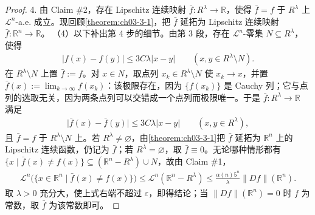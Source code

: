 \documentclass[../../main.tex]{subfiles}%
\begin{document}
\begin{proof}
4. 由 Claim \#2，存在 Lipschitz 连续映射 $\bar f:R^\lambda\to\mathbb{R}$，使得 $\bar f=f$ 于 $R^\lambda$ 上 $\mathcal{L}^n$-a.e. 成立。现回顾\cref{theorem:ch03-3-1}，把 $\bar f$ 延拓为 Lipschitz 连续映射 $\bar f:\mathbb{R}^n\to\mathbb{R}$。%
（4）以下补出第 4 步的细节。由第 3 段，存在 $\mathcal{L}^n$-零集 $N\subseteq R^\lambda$，使得
\begin{align*}
\lvert f(x)-f(y)\rvert\le3C\lambda\lvert x-y\rvert\qquad(x,y\in R^\lambda\setminus N).
\end{align*}
在 $R^\lambda\setminus N$ 上置 $\bar f:=f$。对 $x\in N$，取点列 $x_k\in R^\lambda\setminus N$ 使 $x_k\to x$，并置 $\bar f(x):=\lim_{k\to\infty}f(x_k)$：该极限存在，因为 $\{f(x_k)\}$ 是 Cauchy 列；它与点列的选取无关，因为两条点列可以交错成一个点列而极限唯一。于是 $\bar f:R^\lambda\to\mathbb{R}$ 满足
\begin{align*}
\lvert\bar f(x)-\bar f(y)\rvert\le3C\lambda\lvert x-y\rvert\qquad(x,y\in R^\lambda),
\end{align*}
且 $\bar f=f$ 于 $R^\lambda\setminus N$ 上。若 $R^\lambda\ne\varnothing$，由\cref{theorem:ch03-3-1}把 $\bar f$ 延拓为 $\mathbb{R}^n$ 上的 Lipschitz 连续函数，仍记为 $\bar f$；若 $R^\lambda=\varnothing$，取 $\bar f\equiv0$。无论哪种情形都有 $\{x\mid\bar f(x)\ne f(x)\}\subseteq(\mathbb{R}^n-R^\lambda)\cup N$，故由 Claim \#1，%
\begin{align*}
\mathcal{L}^n\bigl(\{x\in\mathbb{R}^n\mid\bar f(x)\ne f(x)\}\bigr)\le\mathcal{L}^n(\mathbb{R}^n-R^\lambda)\le\frac{\alpha(n)5^n}{\lambda}\lVert Df\rVert(\mathbb{R}^n).
\end{align*}
取 $\lambda>0$ 充分大，使上式右端不超过 $\varepsilon$，即得结论；当 $\lVert Df\rVert(\mathbb{R}^n)=0$ 时 $f$ 为常数，取 $\bar f$ 为该常数即可。%
\end{proof}
\end{document}
